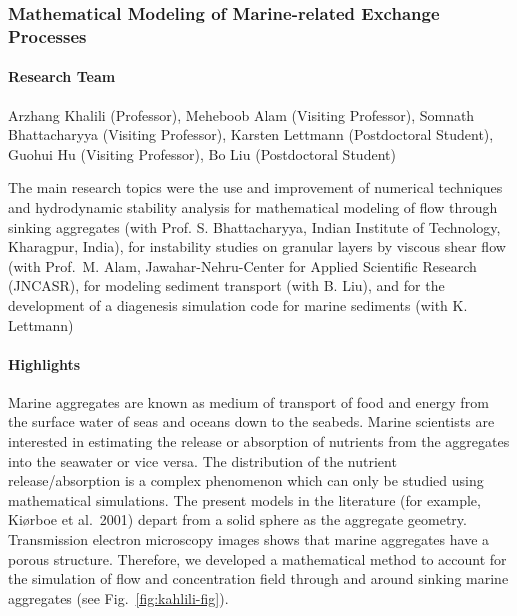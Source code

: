 \subsubsection{Mathematical Modeling of Marine-related Exchange Processes}


\paragraph{Research Team}

Arzhang Khalili (Professor), Meheboob Alam (Visiting Professor),
Somnath Bhattacharyya (Visiting Professor),
Karsten Lettmann (Postdoctoral Student), Guohui Hu (Visiting Professor),
Bo Liu (Postdoctoral Student)

\medskip

The main research topics were the use and improvement of numerical
techniques and hydrodynamic stability analysis for mathematical modeling of
    flow through sinking aggregates
        (with Prof. S. Bhattacharyya,
        Indian Institute of Technology, Kharagpur, India),
    for instability studies on granular layers by viscous shear flow
        (with Prof.~M. Alam, Jawahar-Nehru-Center for
        Applied Scientific Research (JNCASR),
    for modeling sediment transport
        (with B. Liu),
    and for the development of a diagenesis
    simulation code for marine sediments
        (with K. Lettmann)


\paragraph{Highlights}

Marine aggregates are known as medium of transport of food
and energy from the surface water of seas and oceans down to the seabeds.
Marine scientists are interested in estimating the release or absorption
of nutrients from the aggregates into the seawater or vice versa.
The distribution of the nutrient release/absorption is a complex phenomenon
which can only be studied using mathematical simulations.
The present models in the literature (for example, Ki{\o}rboe et al.\ 2001)
depart from a solid sphere as the aggregate geometry.
Transmission electron microscopy images shows that marine aggregates have
a porous structure. Therefore, we developed a mathematical
\cite{BhaDhiKha06} method to account
for the simulation of flow and concentration field through and around
sinking marine aggregates (see Fig.~\ref{fig:kahlili-fig}).

